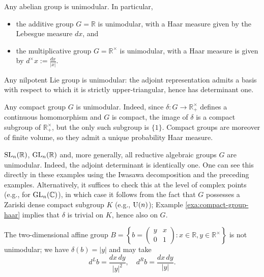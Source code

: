 \documentclass[reqno]{amsart} 
\begin{document}
\begin{example}
  Any abelian group is unimodular.  In particular,
  \begin{itemize}
  \item the additive group $G = \mathbb{R}$ is unimodular, with a Haar measure given by the Lebesgue measure $d x$, and
  \item the multiplicative group $G = \mathbb{R}^\times$ is unimodular, with a Haar measure is given by $d^\times x := \frac{d x}{|x|}$.
  \end{itemize}
\end{example}
\begin{example}
  Any nilpotent Lie group is unimodular: the adjoint representation admits a basis with respect to which it is strictly upper-triangular, hence has determinant one.
\end{example}
\begin{example}\label{exa:compact-group-haar}
  Any compact group $G$ is unimodular.  Indeed, since $\delta : G \rightarrow \mathbb{R}^\times_+$ defines a continuous homomorphism and $G$ is compact, the image of $\delta$ is a compact subgroup of $\mathbb{R}^\times_+$, but the only such subgroup is $\{1\}$.  Compact groups are moreover of finite volume, so they admit a unique probability Haar measure.
\end{example}
\begin{example}
  $\operatorname{SL}_n(\mathbb{R})$, $\operatorname{GL}_n(\mathbb{R})$ and, more generally, all reductive algebraic groups $G$ are unimodular.  Indeed, the adjoint determinant is identically one.  One can see this directly in these examples using the Iwasawa decomposition and the preceding examples.  Alternatively, it suffices to check this at the level of complex points (e.g., for $\operatorname{GL}_n(\mathbb{C})$), in which case it follows from the fact that $G$ possesses a Zariski dense compact subgroup $K$ (e.g., $\operatorname{U}(n)$); Example \ref{exa:compact-group-haar} implies that $\delta$ is trivial on $K$, hence also on $G$.
\end{example}
\begin{example}
  The two-dimensional affine group $B = \left\{ b = 
    \begin{pmatrix}
      y & x \\
      0 & 1
    \end{pmatrix}
    : x \in \mathbb{R}, y \in \mathbb{R}^\times \right\}$ is not unimodular; we have $\delta(b) = |y|$ and may take
  \begin{equation*}
    d^L b = \frac{d x \, d y}{|y|^2}, \quad d^R b = \frac{d x \, d y}{|y|}.
  \end{equation*}
\end{example}
\end{document}

